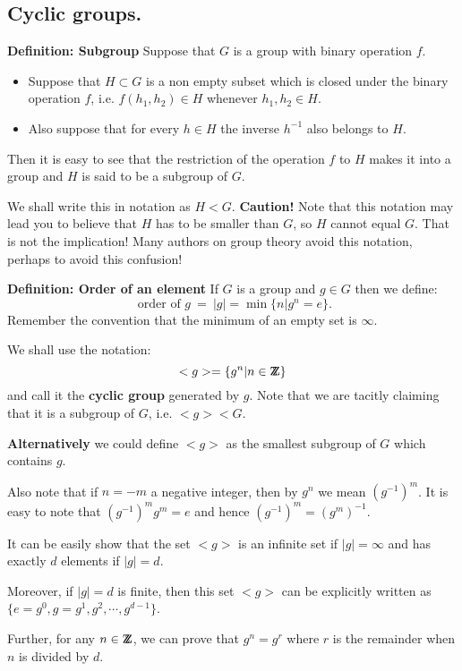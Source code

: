 \documentclass[12pt]{article}
\newcommand{\deff}[1]{{\bf Definition: #1} }
\def\DZ{ \mbox{\rm Z \kern -0.75em Z} }
\begin{document}
\subsection{Cyclic groups.}


\deff{Subgroup}
Suppose that $G$ is a group with binary operation $f$.
\begin{itemize}
\item
Suppose that $H\subset G$ is a non empty subset which is closed under
the binary operation $f$, i.e. $f(h_1,h_2)\in H$ whenever $h_1,h_2\in
H$.
\item
Also suppose that for every $h\in H$ the inverse $h^{-1}$ also
belongs to $H$.
\end{itemize}

Then it is easy to see that the restriction of the operation $f$ to $H$
makes it into a group and $H$ is said to be a subgroup of $G$.

We shall write this in notation as $H<G$. 
{\bf Caution!} Note that this notation may lead you to believe that $H$
has to be smaller than $G$, so $H$ cannot equal $G$. That is not the
implication! Many authors on group theory avoid this notation, perhaps
to avoid this confusion!

\deff{Order of an element}
If $G$ is a group and $g\in G$ then we
define:
$$\mbox{ order of } g ~=~ |g| = \min\{ n | g^n = e\}.$$
Remember the convention that the minimum of an empty set is $\infty$.

We shall use the notation:
$$<g> = \{ g^n | n\in \DZ \}$$
and call it the {\bf cyclic group} generated by $g$. Note that we are
tacitly claiming that it is a subgroup of $G$, i.e. $<g><G$. 

{\bf Alternatively} we could define $<g>$ as the smallest subgroup of $G$
which contains $g$.

Also note that if $n=-m$ a negative integer, then by $g^n$ we mean
$\left(g^{-1}\right)^m$. It is easy to note that $\left(g^{-1}\right)^mg^m=e$ and
hence $\left(g^{-1}\right)^m = \left(g^m\right)^{-1}$.


It can be easily show that the set
$<g>$ is an infinite set if $|g|=\infty$ and has
exactly $d$ elements if $|g|=d$.

Moreover, if $|g|=d$ is finite, then this set $<g>$ can be explicitly
written as $\{ e=g^0,g=g^1, g^2,\cdots,g^{d-1}\}$.

Further, for any $n\in \DZ$, we can prove that $g^n = g^r$ where $r$ is
the remainder when $n$ is divided by $d$.
\end{document}
